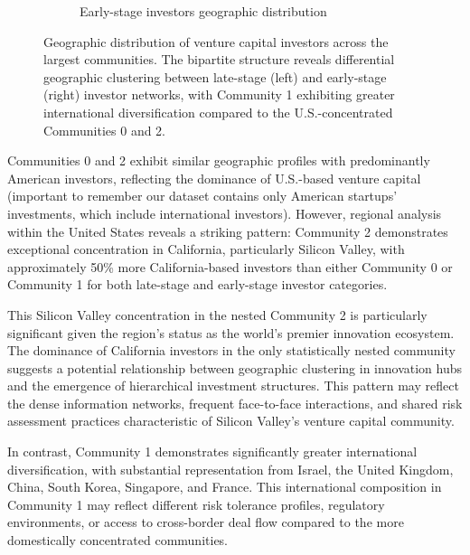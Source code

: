 \begin{figure}[htbp]
\begin{subfigure}{0.48\textwidth}
    \caption{Early-stage investors geographic distribution}
    \label{fig:early_stage_geo}
\end{subfigure}
\caption{Geographic distribution of venture capital investors across the largest communities. The bipartite structure reveals differential geographic clustering between late-stage (left) and early-stage (right) investor networks, with Community 1 exhibiting greater international diversification compared to the U.S.-concentrated Communities 0 and 2.}
\label{fig:geographic_distribution}
\end{figure}


Communities 0 and 2 exhibit similar geographic profiles with predominantly American investors, reflecting the dominance of U.S.-based venture capital (important to remember our dataset contains only American startups' investments, which include international investors). However, regional analysis within the United States reveals a striking pattern: Community 2 demonstrates exceptional concentration in California, particularly Silicon Valley, with approximately 50\% more California-based investors than either Community 0 or Community 1 for both late-stage and early-stage investor categories.

This Silicon Valley concentration in the nested Community 2 is particularly significant given the region's status as the world's premier innovation ecosystem. The dominance of California investors in the only statistically nested community suggests a potential relationship between geographic clustering in innovation hubs and the emergence of hierarchical investment structures. This pattern may reflect the dense information networks, frequent face-to-face interactions, and shared risk assessment practices characteristic of Silicon Valley's venture capital community.

In contrast, Community 1 demonstrates significantly greater international diversification, with substantial representation from Israel, the United Kingdom, China, South Korea, Singapore, and France. This international composition in Community 1 may reflect different risk tolerance profiles, regulatory environments, or access to cross-border deal flow compared to the more domestically concentrated communities.

